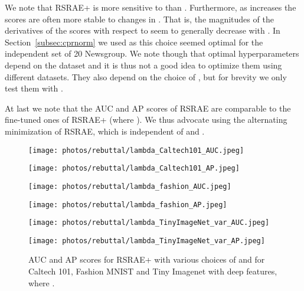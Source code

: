 \documentclass{article} \usepackage{iclr2020_conference,times}
\def\Secref#1{Section~\ref{#1}}
\begin{document}
We note that RSRAE+ is more sensitive to  than . Furthermore, as  increases the scores are often more stable to changes in . That is, the magnitudes of the derivatives of the scores with respect to  seem to generally decrease with . In \Secref{subsec:cprnorm} we used 
 as this choice seemed optimal for the independent set of 20 Newsgroup. We note though that optimal hyperparameters depend on the dataset and it is thus not a good idea to optimize them using different datasets. They also depend on the choice of , but for brevity we only test them with .



At last we note that the AUC and AP scores of RSRAE are comparable to the fine-tuned ones of RSRAE+ (where ). We thus advocate using the alternating minimization of RSRAE, which is independent of  and .


\begin{figure}[htbp]
\centering
\begin{minipage}[t]{0.48\textwidth}
\centering
\texttt{[image: photos/rebuttal/lambda\_Caltech101\_AUC.jpeg]}
\end{minipage}
\begin{minipage}[t]{0.48\textwidth}
\centering
\texttt{[image: photos/rebuttal/lambda\_Caltech101\_AP.jpeg]}
\end{minipage}


\centering
\begin{minipage}[t]{0.48\textwidth}
\centering
\texttt{[image: photos/rebuttal/lambda\_fashion\_AUC.jpeg]}
\end{minipage}
\begin{minipage}[t]{0.48\textwidth}
\centering
\texttt{[image: photos/rebuttal/lambda\_fashion\_AP.jpeg]}
\end{minipage}


\centering
\begin{minipage}[t]{0.48\textwidth}
\centering
\texttt{[image: photos/rebuttal/lambda\_TinyImageNet\_var\_AUC.jpeg]}
\end{minipage}
\begin{minipage}[t]{0.48\textwidth}
\centering
\texttt{[image: photos/rebuttal/lambda\_TinyImageNet\_var\_AP.jpeg]}
\end{minipage}


\caption{AUC and AP scores for RSRAE+ with various choices of  and  for Caltech 101, Fashion MNIST and Tiny Imagenet with deep features, where .}
\label{fig:hyperparameters}

\end{figure}
\end{document}
